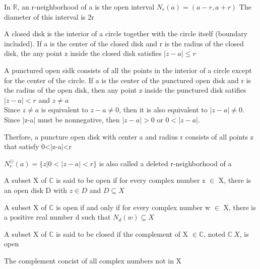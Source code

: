 \documentclass{article}
\begin{document}
\begin{definition}[Diameter]
    In $\mathbb{R}$, an r-neighborhood of a is the open interval $N_r(a)=(a-r, a+r)$
    The diameter of this interval is 2r
\end{definition}

\begin{definition}
    A closed disk is the interior of a circle together with the circle itself
    (boundary included). If a is the center of the closed disk and r is the radius
    of the closed disk, the any point z inside the closed disk satisfies
    $ |z-a| \leq r $
\end{definition}

\begin{definition}
    A punctured open sidk consists of all the points in the interior of a circle
    except for the center of the circle. If a is the center of the punctured open
    disk and r is the radius of the open disk, then any point z inside the
    punctured disk satifies $|z-a|<r$ and $z \neq a$\\

    Since $z \neq a$ is equivalent to $z-a \neq 0$, then it is also equivalent to
    $ |z-a| \neq 0$. Since |z-a| must be nonnegative, then $|z-a|>0$ or $ 0<|z-a|$.

    Therfore, a puncture open disk with center a and radius r consists of all
    points z that satisfy 0<|z-a|<r
\end{definition}

\begin{definition}
    $N_{r}^{\odot}(a)=\{z|0<| z-a \mid<r\}$ is also called a deleted r-neighborhood
    of a
\end{definition}

\begin{definition}
    A subset X of $\mathbb{C} $ is said to be open if for every complex number
    z $\in$ X, there is an open disk D with $z \in D$ and $D \subseteq X$
\end{definition}

\begin{theorem}
    A subset X of $\mathbb{C}$ is open if and only if for every complex number
    w $\in$ X, there is a positive real number d such that $N_d(w) \subseteq X$
\end{theorem}

\begin{theorem}
    A subset X of $\mathbb{C}$ is said to be closed if the complement of X
    $\in \mathbb{C}$, noted $\mathbb{C} \ X$, is open

    The complement concist of all complex numbers not in X
\end{theorem}
\end{document}
